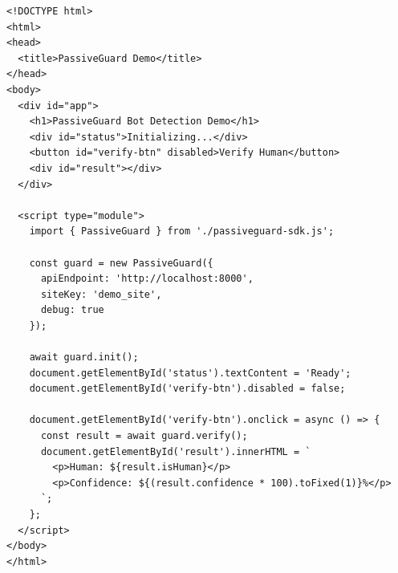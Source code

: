 \begin{verbatim}
<!DOCTYPE html>
<html>
<head>
  <title>PassiveGuard Demo</title>
</head>
<body>
  <div id="app">
    <h1>PassiveGuard Bot Detection Demo</h1>
    <div id="status">Initializing...</div>
    <button id="verify-btn" disabled>Verify Human</button>
    <div id="result"></div>
  </div>
  
  <script type="module">
    import { PassiveGuard } from './passiveguard-sdk.js';
    
    const guard = new PassiveGuard({
      apiEndpoint: 'http://localhost:8000',
      siteKey: 'demo_site',
      debug: true
    });
    
    await guard.init();
    document.getElementById('status').textContent = 'Ready';
    document.getElementById('verify-btn').disabled = false;
    
    document.getElementById('verify-btn').onclick = async () => {
      const result = await guard.verify();
      document.getElementById('result').innerHTML = `
        <p>Human: ${result.isHuman}</p>
        <p>Confidence: ${(result.confidence * 100).toFixed(1)}%</p>
      `;
    };
  </script>
</body>
</html>
\end{verbatim}

